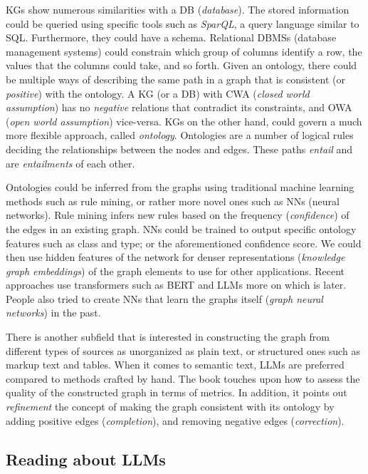 \documentclass{article}
\begin{document}
KGs show numerous similarities with a DB (\textit{database}). The stored information could be queried using specific tools such as \textit{SparQL}, a query language similar to SQL. Furthermore, they could have a schema. Relational DBMSs (database management systems) could constrain which group of columns identify a row, the values that the columns could take, and so forth. Given an ontology, there could be multiple ways of describing the same path in a graph that is consistent (or \textit{positive}) with the ontology. A KG (or a DB) with CWA (\textit{closed world assumption}) has no \textit{negative} relations that contradict its constraints, and OWA (\textit{open world assumption}) vice-versa. KGs on the other hand, could govern a much more flexible approach, called \textit{ontology}. Ontologies are a number of logical rules deciding the relationships between the nodes and edges. These paths \textit{entail} and are \textit{entailments} of each other. 

Ontologies could be inferred from the graphs using traditional machine learning methods such as rule mining, or rather more novel ones such as NNs (neural networks). Rule mining infers new rules based on the frequency (\textit{confidence}) of the edges in an existing graph. NNs could be trained to output specific ontology features such as class and type; or the aforementioned confidence score. We could then use hidden features of the network for denser representations (\textit{knowledge graph embeddings}) of the graph elements to use for other applications. Recent approaches use transformers such as BERT and LLMs more on which is later. People also tried to create NNs that learn the graphs itself (\textit{graph neural networks}) in the past. 

There is another subfield that is interested in constructing the graph from different types of sources as unorganized as plain text, or structured ones such as markup text and tables. When it comes to semantic text, LLMs are preferred compared to methods crafted by hand. The book touches upon how to assess the quality of the constructed graph in terms of metrics. In addition, it points out \textit{refinement} the concept of making the graph consistent with its ontology by adding positive edges (\textit{completion}), and removing negative edges (\textit{correction})\cite{hogan_knowledge_2022}.

\subsection{Reading about LLMs}
\end{document}
